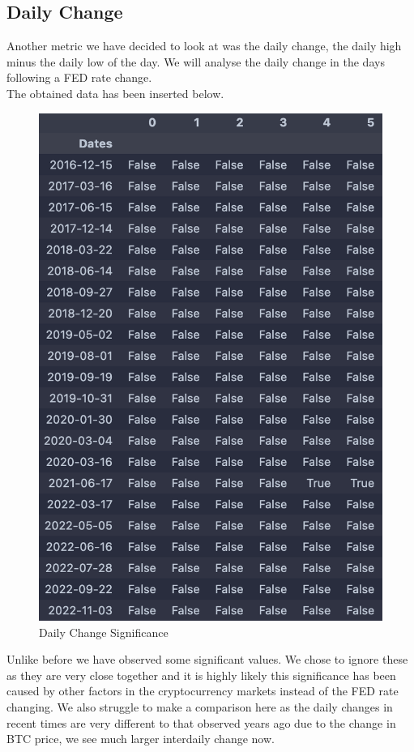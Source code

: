 \documentclass[12pt]{article}
\begin{document}
\subsection{Daily Change}
Another metric we have decided to look at was the daily change, the daily high minus the daily low of the day. We will analyse the daily change in the days following a FED rate change.\\

The obtained data has been inserted below.
\begin{figure}[H]
   \includegraphics[scale=0.7]{research_project/text/paper/10.png}
   \centering
   \caption{Daily Change Significance}
   \label{fig:FED Rate evolution 2016 - 2022}
\end{figure}
Unlike before we have observed some significant values. We chose to ignore these as they are very close together and it is highly likely this significance has been caused by other factors in the cryptocurrency markets instead of the FED rate changing. We also struggle to make a comparison here as the daily changes in recent times are very different to that observed years ago due to the change in BTC price, we see much larger interdaily change now. 
\end{document}
